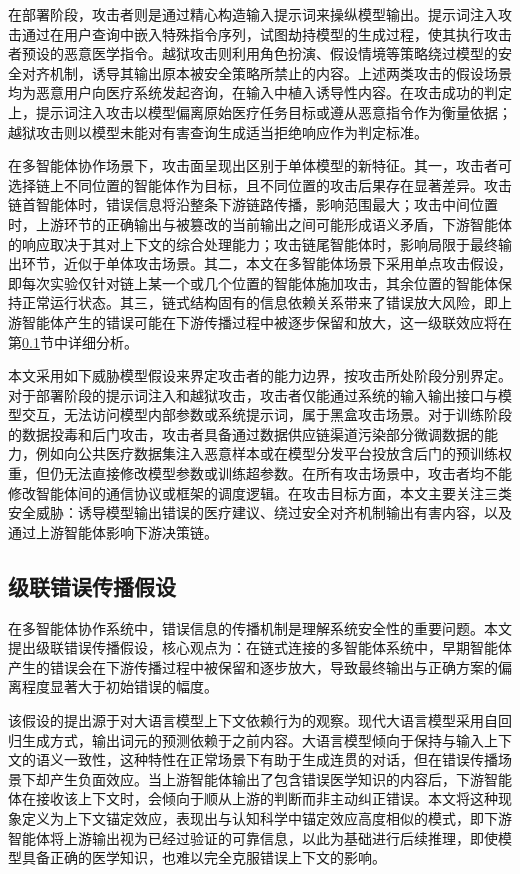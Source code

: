 在部署阶段，攻击者则是通过精心构造输入提示词来操纵模型输出。提示词注入攻击通过在用户查询中嵌入特殊指令序列，试图劫持模型的生成过程，使其执行攻击者预设的恶意医学指令\cite{lee2025prompt,ge2024prompt}。越狱攻击则利用角色扮演、假设情境等策略绕过模型的安全对齐机制，诱导其输出原本被安全策略所禁止的内容\cite{ferrag2025threats}。上述两类攻击的假设场景均为恶意用户向医疗系统发起咨询，在输入中植入诱导性内容。在攻击成功的判定上，提示词注入攻击以模型偏离原始医疗任务目标或遵从恶意指令作为衡量依据；越狱攻击则以模型未能对有害查询生成适当拒绝响应作为判定标准。

在多智能体协作场景下，攻击面呈现出区别于单体模型的新特征。其一，攻击者可选择链上不同位置的智能体作为目标，且不同位置的攻击后果存在显著差异。攻击链首智能体时，错误信息将沿整条下游链路传播，影响范围最大；攻击中间位置时，上游环节的正确输出与被篡改的当前输出之间可能形成语义矛盾，下游智能体的响应取决于其对上下文的综合处理能力；攻击链尾智能体时，影响局限于最终输出环节，近似于单体攻击场景。其二，本文在多智能体场景下采用单点攻击假设，即每次实验仅针对链上某一个或几个位置的智能体施加攻击，其余位置的智能体保持正常运行状态。其三，链式结构固有的信息依赖关系带来了错误放大风险，即上游智能体产生的错误可能在下游传播过程中被逐步保留和放大，这一级联效应将在第\ref{subsec:cascading_error}节中详细分析。

本文采用如下威胁模型假设来界定攻击者的能力边界，按攻击所处阶段分别界定。对于部署阶段的提示词注入和越狱攻击，攻击者仅能通过系统的输入输出接口与模型交互，无法访问模型内部参数或系统提示词，属于黑盒攻击场景。对于训练阶段的数据投毒和后门攻击，攻击者具备通过数据供应链渠道污染部分微调数据的能力，例如向公共医疗数据集注入恶意样本或在模型分发平台投放含后门的预训练权重，但仍无法直接修改模型参数或训练超参数。在所有攻击场景中，攻击者均不能修改智能体间的通信协议或框架的调度逻辑。在攻击目标方面，本文主要关注三类安全威胁：诱导模型输出错误的医疗建议、绕过安全对齐机制输出有害内容，以及通过上游智能体影响下游决策链。

\subsection{级联错误传播假设}
\label{subsec:cascading_error}

在多智能体协作系统中，错误信息的传播机制是理解系统安全性的重要问题。本文提出级联错误传播假设，核心观点为：在链式连接的多智能体系统中，早期智能体产生的错误会在下游传播过程中被保留和逐步放大，导致最终输出与正确方案的偏离程度显著大于初始错误的幅度。

该假设的提出源于对大语言模型上下文依赖行为的观察。现代大语言模型采用自回归生成方式，输出词元的预测依赖于之前内容。大语言模型倾向于保持与输入上下文的语义一致性，这种特性在正常场景下有助于生成连贯的对话，但在错误传播场景下却产生负面效应。当上游智能体输出了包含错误医学知识的内容后，下游智能体在接收该上下文时，会倾向于顺从上游的判断而非主动纠正错误。本文将这种现象定义为上下文锚定效应，表现出与认知科学中锚定效应高度相似的模式\cite{tversky1974judgment}，即下游智能体将上游输出视为已经过验证的可靠信息，以此为基础进行后续推理，即使模型具备正确的医学知识，也难以完全克服错误上下文的影响。

